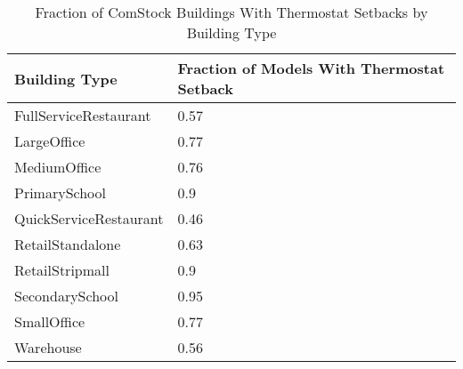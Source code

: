 \begin{table}
\centering
\small
\caption[Fraction of ComStock Buildings with Thermostat Setbacks]{Fraction of ComStock Buildings With Thermostat Setbacks by Building Type}
\label{tab:thermostat_setback_prev}
\begin{tabular}{|l|l|}
\hline
\textbf{Building Type}          & \textbf{Fraction of Models With Thermostat Setback} \\ \hline
FullServiceRestaurant  & 0.57                                                \\ \hline
LargeOffice            & 0.77                                                \\ \hline
MediumOffice           & 0.76                                                \\ \hline
PrimarySchool          & 0.9                                                 \\ \hline
QuickServiceRestaurant & 0.46                                                \\ \hline
RetailStandalone       & 0.63                                                \\ \hline
RetailStripmall        & 0.9                                                 \\ \hline
SecondarySchool        & 0.95                                                \\ \hline
SmallOffice            & 0.77                                                \\ \hline
Warehouse              & 0.56                                                \\ \hline
\end{tabular}
\end{table}